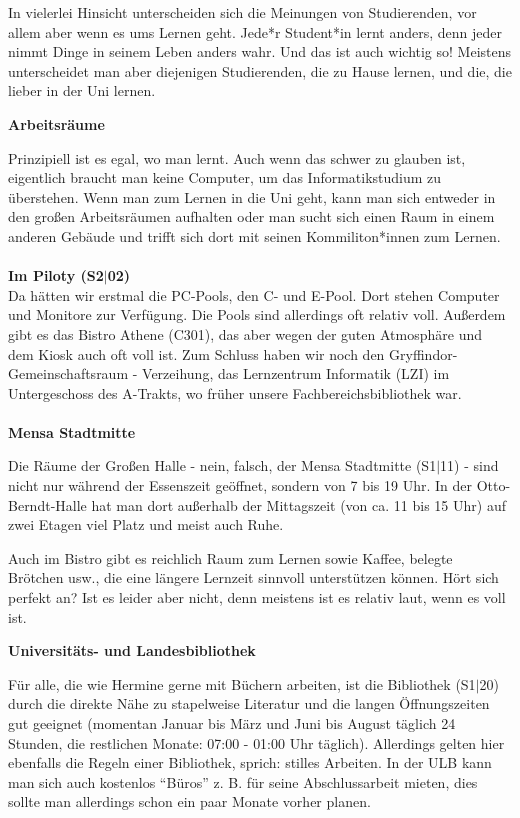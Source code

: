 {In vielerlei Hinsicht unterscheiden sich die Meinungen von Studierenden, vor allem aber wenn es ums Lernen geht. Jede*r Student*in lernt anders, denn jeder nimmt Dinge in seinem Leben anders wahr. Und das ist auch wichtig so! Meistens unterscheidet man aber diejenigen Studierenden, die zu Hause lernen, und die, die lieber in der Uni lernen.
}{
\noindent\textbf{Arbeitsräume}

Prinzipiell ist es egal, wo man lernt. Auch wenn das schwer zu glauben ist, eigentlich braucht man keine Computer, um das Informatikstudium zu überstehen. Wenn man zum Lernen in die Uni geht, kann man sich entweder in den großen Arbeitsräumen aufhalten oder man sucht sich einen Raum in einem anderen Gebäude und trifft sich dort mit seinen Kommiliton*innen zum Lernen.\\ \\
\noindent\textbf{Im Piloty (S2$|$02)}\\
Da hätten wir erstmal die PC-Pools, den C- und E-Pool. Dort stehen Computer und Monitore zur Verfügung. Die Pools sind allerdings oft relativ voll. Außerdem gibt es das Bistro Athene (C301), das aber wegen der guten Atmosphäre und dem Kiosk auch oft voll ist. Zum Schluss haben wir noch den Gryffindor-Gemeinschaftsraum - Verzeihung, das Lernzentrum Informatik (LZI) im Untergeschoss des A-Trakts, wo früher unsere Fachbereichsbibliothek war.\\ \\
\noindent\textbf{Mensa Stadtmitte}

Die Räume der Großen Halle - nein, falsch, der Mensa Stadtmitte (S1$|$11) - sind nicht nur während der Essenszeit geöffnet, sondern von 7 bis 19 Uhr. In der Otto-Berndt-Halle hat man dort außerhalb der Mittagszeit (von ca. 11 bis 15 Uhr) auf zwei Etagen viel Platz und meist auch Ruhe.

Auch im Bistro gibt es reichlich Raum zum Lernen sowie Kaffee, belegte Brötchen usw., die eine längere Lernzeit sinnvoll unterstützen können. Hört sich perfekt an? Ist es leider aber nicht, denn meistens ist es relativ laut, wenn es voll ist.\\


\noindent\textbf{Universitäts- und Landesbibliothek}

Für alle, die wie Hermine gerne mit Büchern arbeiten, ist die Bibliothek (S1$|$20) durch die direkte Nähe zu stapelweise Literatur und die langen Öffnungszeiten gut geeignet (momentan Januar bis März und Juni bis August täglich 24 Stunden, die restlichen Monate: 07:00 - 01:00 Uhr täglich). Allerdings gelten hier ebenfalls die Regeln einer Bibliothek, sprich: stilles Arbeiten. In der ULB kann man sich auch kostenlos "`Büros"' z. B. für seine Abschlussarbeit mieten, dies sollte man allerdings schon ein paar Monate vorher planen.\\

}
